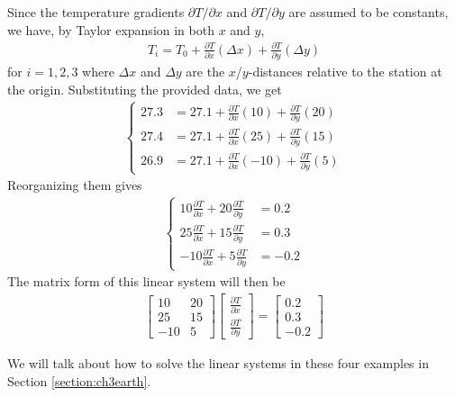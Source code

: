 \begin{solution}
Since the temperature gradients $\partial T/\partial x$ and $\partial T/\partial y$ are assumed to be constants, we have, by Taylor expansion in both $x$ and $y$,
\begin{align*}
T_i = T_0 + \frac{\partial T}{\partial x}(\Delta x) + \frac{\partial T}{\partial y}(\Delta y)
\end{align*}
for $i = 1,2,3$ where $\Delta x$ and $\Delta y$ are the $x$/$y$-distances relative to the station at the origin. Substituting the provided data, we get
\begin{align*}
\begin{cases}
27.3 &= 27.1 + \frac{\partial T}{\partial x}(10) + \frac{\partial T}{\partial y}(20) \\ 
27.4 &= 27.1 + \frac{\partial T}{\partial x}(25) + \frac{\partial T}{\partial y}(15) \\
26.9 &= 27.1 + \frac{\partial T}{\partial x}(-10) + \frac{\partial T}{\partial y}(5) 
\end{cases}
\end{align*}
Reorganizing them gives
\begin{align*}
\begin{cases}
10\frac{\partial T}{\partial x} + 20\frac{\partial T}{\partial y} &= 0.2 \\ 
25\frac{\partial T}{\partial x} + 15\frac{\partial T}{\partial y} &= 0.3 \\
-10\frac{\partial T}{\partial x} + 5\frac{\partial T}{\partial y} &= -0.2
\end{cases}
\end{align*}
The matrix form of this linear system will then be
\begin{align*}
\begin{bmatrix}
10 & 20 \\
25 & 15 \\
-10 & 5
\end{bmatrix}
\begin{bmatrix}
\frac{\partial T}{\partial x} \\
\frac{\partial T}{\partial y} 
\end{bmatrix}
=
\begin{bmatrix}
0.2 \\
0.3 \\
-0.2
\end{bmatrix}
\end{align*}
\end{solution}

We will talk about how to solve the linear systems in these four examples in Section \ref{section:ch3earth}.

